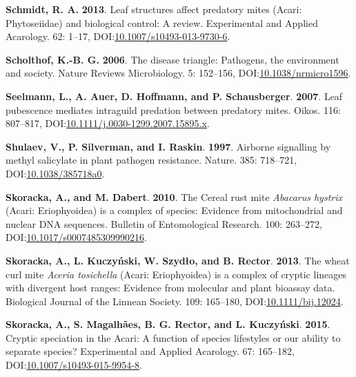 \documentclass[12pt,final,CPage]{ufthesis}
\newlength{\cslhangindent}
\newenvironment{CSLReferences}[2] %
{%
	\setlength{\parindent}{0pt}
	\ifodd #1 \everypar{\setlength{\hangindent}{\cslhangindent}}\ignorespaces\fi
	\ifnum #2 > 0
	\setlength{\parskip}{#2\baselineskip}
	\fi
}%
{}
\begin{document}
{\begin{CSLReferences}{1}{0}
  \leavevmode{}%
  \textbf{Schmidt, R. A.} \textbf{2013}. Leaf structures affect predatory mites ({Acari}: {Phytoseiidae}) and biological control: A review. Experimental and Applied Acarology. 62: 1--17, DOI:\href{https://doi.org/10.1007/s10493-013-9730-6}{10.1007/s10493-013-9730-6}.

  \leavevmode{}%
  \textbf{Scholthof, K.-B. G.} \textbf{2006}. The disease triangle: Pathogens, the environment and society. Nature Reviews Microbiology. 5: 152--156, DOI:\href{https://doi.org/10.1038/nrmicro1596}{10.1038/nrmicro1596}.

  \leavevmode{}%
  \textbf{Seelmann, L., A. Auer, D. Hoffmann, and P. Schausberger}. \textbf{2007}. Leaf pubescence mediates intraguild predation between predatory mites. Oikos. 116: 807--817, DOI:\href{https://doi.org/10.1111/j.0030-1299.2007.15895.x}{10.1111/j.0030-1299.2007.15895.x}.

  \leavevmode{}%
  \textbf{Shulaev, V., P. Silverman, and I. Raskin}. \textbf{1997}. Airborne signalling by methyl salicylate in plant pathogen resistance. Nature. 385: 718--721, DOI:\href{https://doi.org/10.1038/385718a0}{10.1038/385718a0}.

  \leavevmode{}%
  \textbf{Skoracka, A., and M. Dabert}. \textbf{2010}. The {Cereal rust mite} {\emph{Abacarus hystrix}} ({Acari}: {Eriophyoidea}) is a complex of species: Evidence from mitochondrial and nuclear {DNA} sequences. Bulletin of Entomological Research. 100: 263--272, DOI:\href{https://doi.org/10.1017/s0007485309990216}{10.1017/s0007485309990216}.

  \leavevmode{}%
  \textbf{Skoracka, A., L. Kuczyński, W. Szydło, and B. Rector}. \textbf{2013}. The wheat curl mite {\emph{Aceria tosichella}} ({Acari: Eriophyoidea}) is a complex of cryptic lineages with divergent host ranges: Evidence from molecular and plant bioassay data. Biological Journal of the Linnean Society. 109: 165--180, DOI:\href{https://doi.org/10.1111/bij.12024}{10.1111/bij.12024}.

  \leavevmode{}%
  \textbf{Skoracka, A., S. Magalhães, B. G. Rector, and L. Kuczyński}. \textbf{2015}. Cryptic speciation in the {Acari}: A function of species lifestyles or our ability to separate species? Experimental and Applied Acarology. 67: 165--182, DOI:\href{https://doi.org/10.1007/s10493-015-9954-8}{10.1007/s10493-015-9954-8}.


\end{CSLReferences}}
\end{document}
